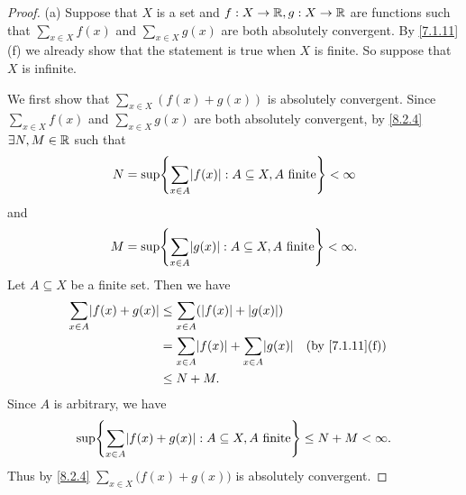 \begin{proof}{(a)}
	Suppose that \(X\) is a set and \(f : X \to \mathbb{R}, g : X \to \mathbb{R}\) are functions such that \(\sum_{x \in X} f(x)\) and \(\sum_{x \in X} g(x)\) are both absolutely convergent.
	By \cref{7.1.11}(f) we already show that the statement is true when \(X\) is finite.
	So suppose that \(X\) is infinite.

	We first show that \(\sum_{x \in X} (f(x) + g(x))\) is absolutely convergent.
	Since \(\sum_{x \in X} f(x)\) and \(\sum_{x \in X} g(x)\) are both absolutely convergent, by \cref{8.2.4} \(\exists N, M \in \mathbb{R}\) such that
	\[
		N = \sup\set{\sum_{x \in A} \abs{f(x)} : A \subseteq X, A \text{ finite}} < \infty
	\]
	and
	\[
		M = \sup\set{\sum_{x \in A} \abs{g(x)} : A \subseteq X, A \text{ finite}} < \infty.
	\]
	Let \(A \subseteq X\) be a finite set.
	Then we have
	\begin{align*}
		\sum_{x \in A} \abs{f(x) + g(x)} & \leq \sum_{x \in A} (\abs{f(x)} + \abs{g(x)})                                             \\
		                                 & = \sum_{x \in A} \abs{f(x)} + \sum_{x \in A} \abs{g(x)} &  & \text{(by \cref{7.1.11}(f))} \\
		                                 & \leq N + M.
	\end{align*}
	Since \(A\) is arbitrary, we have
	\[
		\sup\set{\sum_{x \in A} \abs{f(x) + g(x)} : A \subseteq X, A \text{ finite}} \leq N + M < \infty.
	\]
	Thus by \cref{8.2.4} \(\sum_{x \in X} \big(f(x) + g(x)\big)\) is absolutely convergent.


\end{proof}
